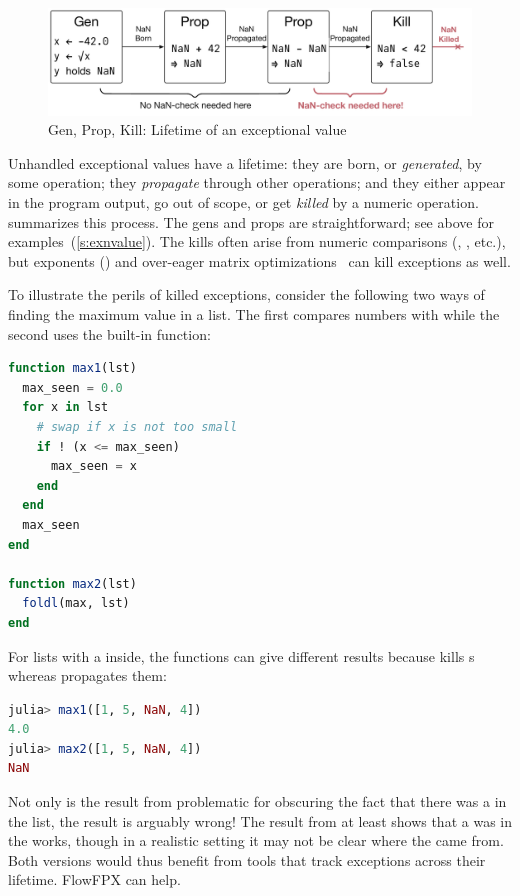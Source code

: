 \documentclass{juliacon}
\begin{document}
\begin{figure}[t]
  \includegraphics[width=\columnwidth]{fig/genpropkill-outline_vector.pdf}
  \caption{Gen, Prop, Kill: Lifetime of an exceptional value}
  \label{f:gpk}
\end{figure}

Unhandled exceptional values have a lifetime: they are born, or \emph{generated}, by some operation; they \emph{propagate} through other operations; and they either appear in the program output, go out of scope, or get \emph{killed} by a numeric operation.
 summarizes this \genpropkill{} process.
The gens and props are straightforward; see above for examples~(\cref{s:exnvalue}).
The kills often arise from numeric comparisons (\code{<}, \code{=}, etc.),
but exponents () and over-eager matrix
optimizations~\cite{ddghlllprr-correctness-2022} can kill exceptions as well.

To illustrate the perils of killed exceptions, consider the following two ways
of finding the maximum value in a list.
The first compares numbers with \code{<=}
while the second uses the built-in  function:

\begin{lstlisting}[language = Julia]
function max1(lst)
  max_seen = 0.0
  for x in lst
    # swap if x is not too small
    if ! (x <= max_seen)
      max_seen = x
    end
  end
  max_seen
end

function max2(lst)
  foldl(max, lst)
end
\end{lstlisting}

For lists with a \Nan{} inside, the functions can give different
results because \code{<=} kills \Nan{}s whereas 
propagates them:

\begin{lstlisting}[language = Julia]
julia> max1([1, 5, NaN, 4]) 
4.0
julia> max2([1, 5, NaN, 4]) 
NaN
\end{lstlisting}

Not only is the result from  problematic for obscuring the fact that there was a \NaN{} in the list, the result is arguably wrong!
The result from  at least shows that a \Nan{} was in the works, though in a realistic setting it may not be clear where the \Nan{} came from.
Both versions would thus benefit from tools that track exceptions across their lifetime.
FlowFPX can help.
\end{document}
